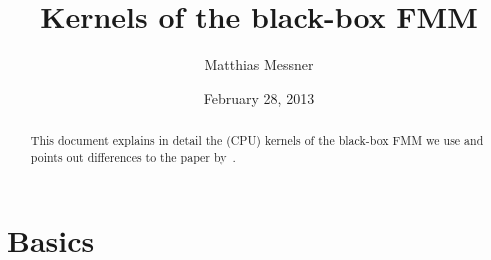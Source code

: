 \documentclass[]{article}
\theoremstyle{plain}
\begin{document}
\title{Kernels of the black-box FMM}
\author{Matthias Messner}
\date{February 28, 2013}
\maketitle

\begin{abstract}
  This document explains in detail the (CPU) kernels of the black-box FMM we
  use and points out differences to the paper by~\citet{fong09a}. 
\end{abstract}

\tableofcontents



\section{Basics}
\label{sec:basics}
\end{document}
